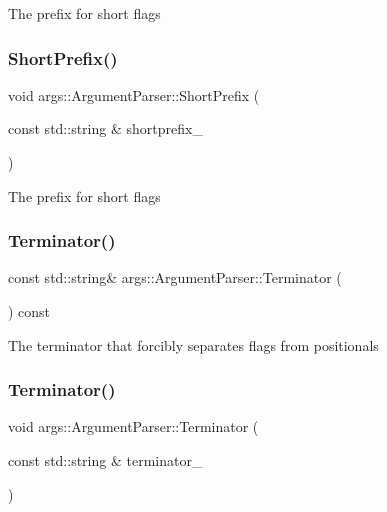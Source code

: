 The prefix for short flags \mbox{\label{classargs_1_1_argument_parser_ad26c7ce7f17994dd0cc81e8137c1e5a8}} 
\subsubsection{\texorpdfstring{Short\+Prefix()}{ShortPrefix()}\hspace{0.1cm}{\footnotesize\ttfamily [2/2]}}
{\footnotesize\ttfamily void args\+::\+Argument\+Parser\+::\+Short\+Prefix (\begin{DoxyParamCaption}\item[{const std\+::string \&}]{shortprefix\+\_\+ }\end{DoxyParamCaption})\hspace{0.3cm}{\ttfamily [inline]}}

The prefix for short flags \mbox{\label{classargs_1_1_argument_parser_ae864b7e947bba6c168780b82ebacdb5e}} 
\subsubsection{\texorpdfstring{Terminator()}{Terminator()}\hspace{0.1cm}{\footnotesize\ttfamily [1/2]}}
{\footnotesize\ttfamily const std\+::string\& args\+::\+Argument\+Parser\+::\+Terminator (\begin{DoxyParamCaption}{ }\end{DoxyParamCaption}) const\hspace{0.3cm}{\ttfamily [inline]}}

The terminator that forcibly separates flags from positionals \mbox{\label{classargs_1_1_argument_parser_aac85423bb4103a71893bc0e0247c1acd}} 
\subsubsection{\texorpdfstring{Terminator()}{Terminator()}\hspace{0.1cm}{\footnotesize\ttfamily [2/2]}}
{\footnotesize\ttfamily void args\+::\+Argument\+Parser\+::\+Terminator (\begin{DoxyParamCaption}\item[{const std\+::string \&}]{terminator\+\_\+ }\end{DoxyParamCaption})\hspace{0.3cm}{\ttfamily [inline]}}

